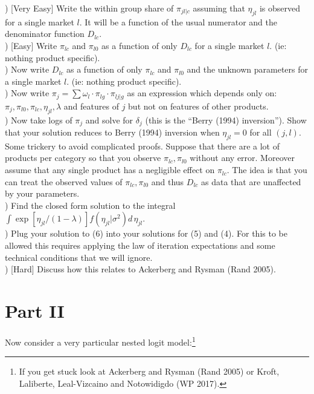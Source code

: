 \documentclass[12pt]{article}
\begin{document}
) [Very Easy] Write the within group share of $\pi_{jl | c}$ assuming that $\eta_{jl}$ is observed for a single market $l$. It will be a function of the usual numerator and the denominator function $D_{lc}$.\\

) [Easy]  Write $\pi_{lc}$ and $\pi_{l0}$ as a function of only $D_{lc}$ for a single market $l$.  (ie: nothing product specific).\\

) Now write $D_{lc}$ as a function of only $\pi_{lc}$ and $\pi_{l0}$ and the unknown parameters for a single market $l$. (ie: nothing product specific).\\

) Now write $\pi_j = \sum \omega_l \cdot \pi_{lg} \cdot \pi_{lj|g}$ as an expression which depends only on: $\pi_j, \pi_{l0},\pi_{lc},\eta_{jl},\lambda$ and features of $j$ but not on features of other products.\\

) Now take logs of $\pi_j$ and solve for $\delta_j$ (this is the ``Berry (1994) inversion''). Show that your solution reduces to Berry (1994) inversion when $\eta_{jl} = 0$ for all $(j,l)$.\\

\noindent Some trickery to avoid complicated proofs. Suppose that there are a lot of products per category so that you observe $\pi_{lc}, \pi_{l0}$ without any error. Moreover assume that any single product has a negligible effect on $\pi_{lc}$. The idea is that you can treat the observed values of $\pi_{lc}, \pi_{l0}$ and thus $D_{lc}$ as data that are unaffected by your parameters.\\

) Find the closed form solution to the integral $\int \exp[\eta_{jl}/(1-\lambda)] f(\eta_{jl} | \sigma^2) d\, \eta_{jl}$.\\

) Plug your solution to (6) into your solutions for (5) and (4). For this to be allowed this requires applying the law of iteration expectations and some technical conditions that we will ignore. \\


) [Hard] Discuss how this relates to Ackerberg and Rysman (Rand 2005).


\section*{\normalsize Part II}
Now consider a very particular nested logit model:\footnote{If you get stuck look at Ackerberg and Rysman (Rand 2005) or Kroft, Laliberte, Leal-Vizcaino and Notowidigdo (WP 2017).}
\end{document}
